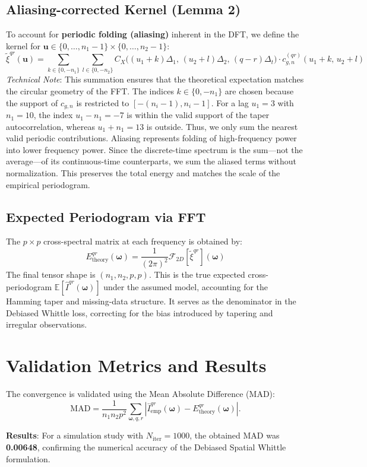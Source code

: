 \documentclass[12pt]{article}
\begin{document}
\subsection{Aliasing-corrected Kernel (Lemma 2)}
To account for \textbf{periodic folding (aliasing)} inherent in the DFT, we define the kernel for $\mathbf{u} \in \{0, \dots, n_1-1\} \times \{0, \dots, n_2-1\}$:
\[
  \tilde{\xi}^{qr}(\mathbf{u}) = \sum_{k \in \{0,-n_1\}} \sum_{l \in \{0,-n_2\}}
  C_X\!\bigl((u_1+k)\Delta_1,\,(u_2+l)\Delta_2,\,(q-r)\Delta_t\bigr)
  \cdot c_{g,n}^{(qr)}(u_1+k,\, u_2+l)
\]
\noindent\textit{Technical Note}: This summation ensures that the theoretical expectation matches the circular geometry of the FFT. The indices $k \in \{0, -n_1\}$ are chosen because the support of $c_{g,n}$ is restricted to $[-(n_i-1), n_i-1]$. For a lag $u_1=3$ with $n_1=10$, the index $u_1-n_1 = -7$ is within the valid support of the taper autocorrelation, whereas $u_1+n_1 = 13$ is outside. Thus, we only sum the nearest valid periodic contributions. Aliasing represents folding of high-frequency power into lower frequency power. Since the discrete-time spectrum is the sum---not the average---of its continuous-time counterparts, we sum the aliased terms without normalization. This preserves the total energy and matches the scale of the empirical periodogram.

\subsection{Expected Periodogram via FFT}
The $p \times p$ cross-spectral matrix at each frequency is obtained by:
\[
  \boxed{ E^{qr}_{\text{theory}}(\boldsymbol{\omega}) = \frac{1}{(2\pi)^2} \mathcal{F}_{2D}[\tilde{\xi}^{qr}](\boldsymbol{\omega}) }
\]
The final tensor shape is $(n_1, n_2, p, p)$. This is the true expected cross-periodogram $\mathbb{E}[\hat{I}^{qr}(\bm{\omega})]$
under the assumed model, accounting for the Hamming taper and missing-data
structure. It serves as the denominator in the Debiased Whittle loss,
correcting for the bias introduced by tapering and irregular observations.

\section{Validation Metrics and Results}

The convergence is validated using the Mean Absolute Difference (MAD):
\[
  \text{MAD} = \frac{1}{n_1 n_2 p^2} \sum_{\boldsymbol{\omega}, q, r} \left| \bar{I}^{qr}_{\text{emp}}(\boldsymbol{\omega}) - E^{qr}_{\text{theory}}(\boldsymbol{\omega}) \right|.
\]

\textbf{Results}: For a simulation study with $N_{\text{iter}} = 1000$, the obtained MAD was \textbf{0.00648}, confirming the numerical accuracy of the Debiased Spatial Whittle formulation.
\end{document}
